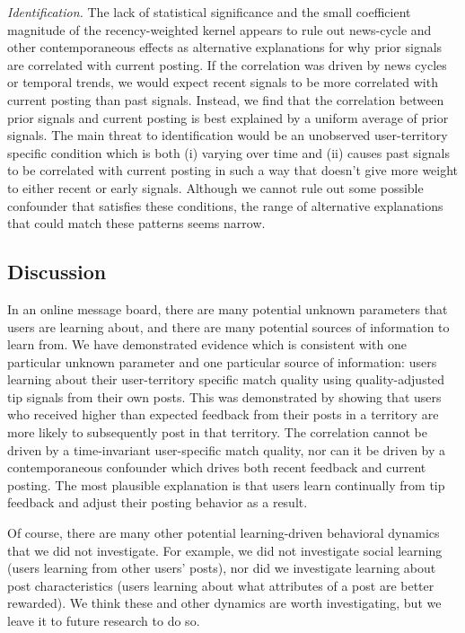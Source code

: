 \noindent \emph{Identification.}  The lack of statistical significance and the small coefficient magnitude of the recency-weighted kernel appears to rule out news-cycle and other contemporaneous effects as alternative explanations for why prior signals are correlated with current posting. If the correlation was driven by news cycles or temporal trends, we would expect recent signals to be more correlated with current posting than past signals. Instead, we find that the correlation between prior signals and current posting is best explained by a uniform average of prior signals. The main threat to identification would be an unobserved user-territory specific condition which is both (i) varying over time and (ii) causes past signals to be correlated with current posting in such a way that doesn't give more weight to either recent or early signals. Although we cannot rule out some possible confounder that satisfies these conditions, the range of alternative explanations that could match these patterns seems narrow.


\subsection{Discussion}

In an online message board, there are many potential unknown parameters that users are learning about, and there are many potential sources of information to learn from. We have demonstrated evidence which is consistent with one particular  unknown parameter and one particular source of information: users learning about their user-territory specific match quality using quality-adjusted tip signals from their own posts. This was demonstrated by showing that users who received higher than expected feedback from their posts in a territory are more likely to subsequently post in that territory. The correlation cannot be driven by a time-invariant user-specific match quality, nor can it be driven by a contemporaneous confounder which drives both recent feedback and current posting. The most plausible explanation is that users learn continually from tip feedback and adjust their posting behavior as a result.

Of course, there are many other potential learning-driven behavioral dynamics that we did not investigate. For example, we did not investigate social learning (users learning from other users' posts), nor did we investigate learning about post characteristics (users learning about what attributes of a post are better rewarded). We think these and other dynamics are worth investigating, but we leave it to future research to do so.






